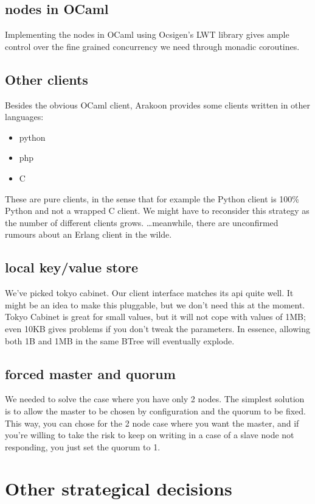 \subsection{nodes in OCaml}
Implementing the nodes in OCaml using Ocsigen's LWT library gives ample control over the fine grained concurrency we need through monadic coroutines.
\subsection{Other clients}
Besides the obvious OCaml client, Arakoon provides some clients written in other languages:
\begin{itemize}
\item{python}
\item{php}
\item{C}
\end{itemize}
These are pure clients, in the sense that for example the Python client is 100\% Python and not a wrapped C client. 
We might have to reconsider this strategy as the number of different clients grows. \ldots meanwhile, there are unconfirmed rumours about an Erlang client in the wilde.

\subsection{local key/value store}
We've picked tokyo cabinet. 
Our client interface matches its api quite well. 
It might be an idea to make this pluggable, but we don't need this at the moment.
Tokyo Cabinet is great for small values, but it will not cope with values of 1MB; 
even 10KB gives problems if you don't tweak the parameters. 
In essence, allowing both 1B and 1MB in the same BTree will eventually explode.

\subsection{forced master and quorum}
We needed to solve the case where you have only 2 nodes.
The simplest solution is to allow the master to be chosen by configuration and the quorum to be fixed. 
This way, you can chose for the 2 node case where you want the master, 
and if you're willing to take the risk to keep on writing in a case of a slave node not responding, you just set the quorum to 1.

\section{Other strategical decisions}
